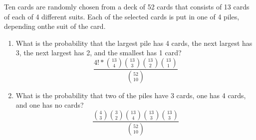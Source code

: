 \item Ten cards are randomly chosen from a deck of 52 cards that consists of 13 cards of each of 4 different suits. Each of the selected cards is put in one of 4 piles, depending onthe suit of the card.
\begin{enumerate}
    \item What is the probability that the largest pile has 4 cards, the next largest has 3, the next largest has 2, and the smallest has 1 card?
    \[ \frac{4! * \binom{13}{4}\binom{13}{3}\binom{13}{2}\binom{13}{1}}{\binom{52}{10}} \]
    \item What is the probability that two of the piles have 3 cards, one has 4 cards, and one has no cards?
    \[ \frac{\binom{4}{3} \binom{3}{2} \binom{13}{4}\binom{13}{3}\binom{13}{3}}{\binom{52}{10}} \]
\end{enumerate}
